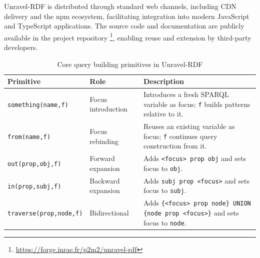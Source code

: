 \documentclass[
]{ceurart}
\begin{document}
Unravel-RDF is distributed through standard web channels, including
CDN delivery and the npm ecosystem, facilitating integration into
modern JavaScript and TypeScript applications. The source code and
documentation are publicly available in the project repository
\footnote{\url{https://forge.inrae.fr/p2m2/unravel-rdf}},
enabling reuse and extension by third-party developers.

\begin{table}[t]
\centering
\setlength{\tabcolsep}{3pt}
{\footnotesize
\caption{Core query building primitives in Unravel-RDF}
\label{tab:query-primitives}
\begin{tabular}{|l|p{3cm}|p{6cm}|}
\hline
\textbf{Primitive} & \textbf{Role} & \textbf{Description} \\
\hline
\texttt{something(name,f)} 
  & Focus introduction 
  & Introduces a fresh SPARQL variable as focus; \texttt{f} builds patterns relative to it. \\
\hline
\texttt{from(name,f)} 
  & Focus rebinding 
  & Reuses an existing variable as focus; \texttt{f} continues query construction from it. \\
\hline
\texttt{out(prop,obj,f)} 
  & Forward expansion 
  & Adds \texttt{<focus> prop obj} and sets focus to \texttt{obj}. \\
\hline
\texttt{in(prop,subj,f)} 
  & Backward expansion 
  & Adds \texttt{subj prop <focus>} and sets focus to \texttt{subj}. \\
\hline
\texttt{traverse(prop,node,f)} 
  & Bidirectional 
  & Adds \texttt{\{<focus> prop node\} UNION \{node prop <focus>\}} and sets focus to \texttt{node}. \\
\hline
\end{tabular}
}
\end{table}
\end{document}

